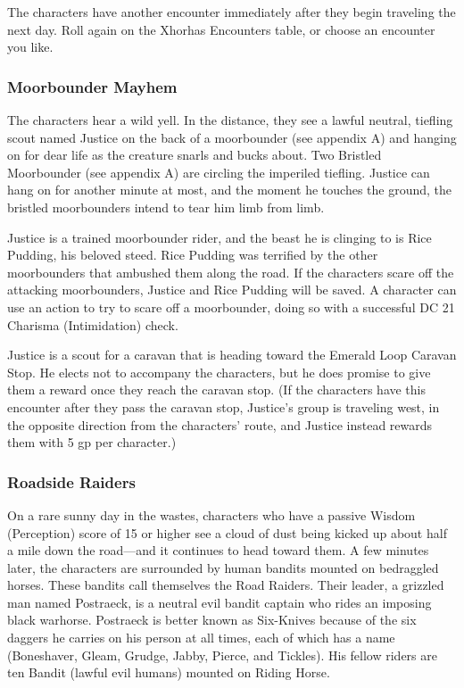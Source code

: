 \documentclass[10pt,a4paper,twoside,twocolumn,openany,nodeprecatedcode]{dndbook}
\begin{document}
The characters have another encounter immediately after they begin traveling the next day. Roll again on the Xhorhas Encounters table, or choose an encounter you like.

\subsubsection{Moorbounder Mayhem}
The characters hear a wild yell. In the distance, they see a lawful neutral, tiefling scout named Justice on the back of a moorbounder (see appendix A) and hanging on for dear life as the creature snarls and bucks about. Two Bristled Moorbounder (see appendix A) are circling the imperiled tiefling. Justice can hang on for another minute at most, and the moment he touches the ground, the bristled moorbounders intend to tear him limb from limb.

Justice is a trained moorbounder rider, and the beast he is clinging to is Rice Pudding, his beloved steed. Rice Pudding was terrified by the other moorbounders that ambushed them along the road. If the characters scare off the attacking moorbounders, Justice and Rice Pudding will be saved. A character can use an action to try to scare off a moorbounder, doing so with a successful DC 21 Charisma (Intimidation) check.

Justice is a scout for a caravan that is heading toward the Emerald Loop Caravan Stop. He elects not to accompany the characters, but he does promise to give them a reward once they reach the caravan stop. (If the characters have this encounter after they pass the caravan stop, Justice's group is traveling west, in the opposite direction from the characters' route, and Justice instead rewards them with 5 gp per character.)

\subsubsection{Roadside Raiders}
On a rare sunny day in the wastes, characters who have a passive Wisdom (Perception) score of 15 or higher see a cloud of dust being kicked up about half a mile down the road—and it continues to head toward them. A few minutes later, the characters are surrounded by human bandits mounted on bedraggled horses. These bandits call themselves the Road Raiders. Their leader, a grizzled man named Postraeck, is a neutral evil bandit captain who rides an imposing black warhorse. Postraeck is better known as Six-Knives because of the six daggers he carries on his person at all times, each of which has a name (Boneshaver, Gleam, Grudge, Jabby, Pierce, and Tickles). His fellow riders are ten Bandit (lawful evil humans) mounted on Riding Horse.
\end{document}
